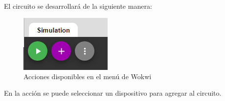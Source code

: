 \documentclass{article}
\begin{document}
    \bigbreak

    El circuito se desarrollará de la siguiente manera:

    \begin{figure}[H]
        \centering
        \includegraphics[width=0.2\paperwidth]{images/wokwi-actions}
        \caption{Acciones disponibles en el menú de Wokwi}
    \end{figure}

    En la acción  se puede seleccionar un dispositivo
    para agregar al circuito.
\end{document}
